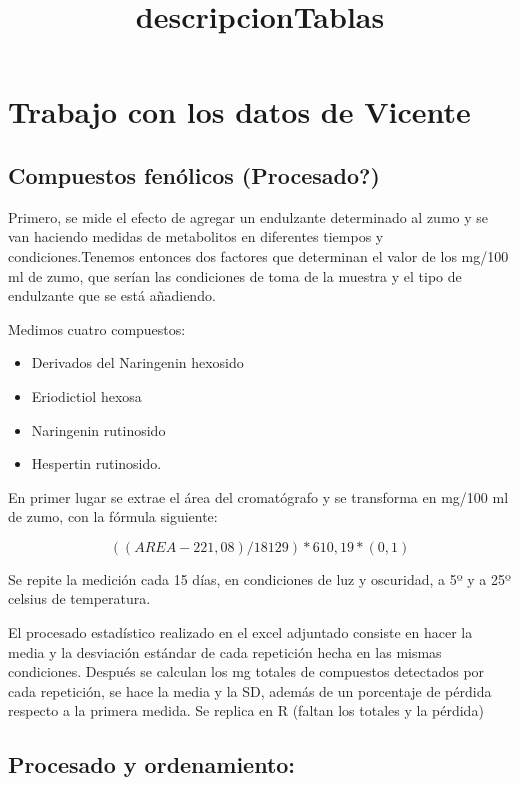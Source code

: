 \documentclass[
]{article}
\title{descripcionTablas}
\author{}
\date{\vspace{-2.5em}}
\providecommand{\tightlist}{%
  \setlength{\itemsep}{0pt}\setlength{\parskip}{0pt}}
\begin{document}
\maketitle

\hypertarget{trabajo-con-los-datos-de-vicente}{%
\section{Trabajo con los datos de
Vicente}\label{trabajo-con-los-datos-de-vicente}}

\hypertarget{compuestos-fenuxf3licos-procesado}{%
\subsection{Compuestos fenólicos
(Procesado?)}\label{compuestos-fenuxf3licos-procesado}}

Primero, se mide el efecto de agregar un endulzante determinado al zumo
y se van haciendo medidas de metabolitos en diferentes tiempos y
condiciones.Tenemos entonces dos factores que determinan el valor de los
mg/100 ml de zumo, que serían las condiciones de toma de la muestra y el
tipo de endulzante que se está añadiendo.

Medimos cuatro compuestos:

\begin{itemize}
\tightlist
\item
  Derivados del Naringenin hexosido
\item
  Eriodictiol hexosa
\item
  Naringenin rutinosido
\item
  Hespertin rutinosido.
\end{itemize}

En primer lugar se extrae el área del cromatógrafo y se transforma en
mg/100 ml de zumo, con la fórmula siguiente:

\[((AREA-221,08)/18129)*610,19*(0,1)\]

Se repite la medición cada 15 días, en condiciones de luz y oscuridad, a
5º y a 25º celsius de temperatura.

El procesado estadístico realizado en el excel adjuntado consiste en
hacer la media y la desviación estándar de cada repetición hecha en las
mismas condiciones. Después se calculan los mg totales de compuestos
detectados por cada repetición, se hace la media y la SD, además de un
porcentaje de pérdida respecto a la primera medida. Se replica en R
(faltan los totales y la pérdida)

\hypertarget{procesado-y-ordenamiento}{%
\subsection{Procesado y ordenamiento:}\label{procesado-y-ordenamiento}}
\end{document}
